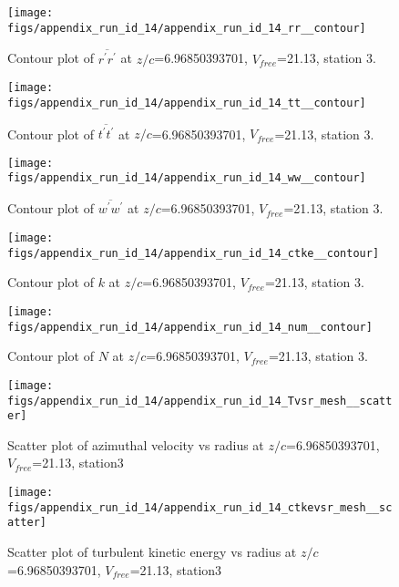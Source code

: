 \begin{figure}[H]
\centering
\texttt{[image: figs/appendix\_run\_id\_14/appendix\_run\_id\_14\_rr\_\_contour]}
\caption{Contour plot of $\overline{r^\prime r^\prime}$ at $z/c$=6.96850393701, $V_{free}$=21.13, station 3.}
\label{fig:appendix_run_id_14_rr__contour}
\end{figure}


\begin{figure}[H]
\centering
\texttt{[image: figs/appendix\_run\_id\_14/appendix\_run\_id\_14\_tt\_\_contour]}
\caption{Contour plot of $\overline{t^\prime t^\prime}$ at $z/c$=6.96850393701, $V_{free}$=21.13, station 3.}
\label{fig:appendix_run_id_14_tt__contour}
\end{figure}


\begin{figure}[H]
\centering
\texttt{[image: figs/appendix\_run\_id\_14/appendix\_run\_id\_14\_ww\_\_contour]}
\caption{Contour plot of $\overline{w^\prime w^\prime}$ at $z/c$=6.96850393701, $V_{free}$=21.13, station 3.}
\label{fig:appendix_run_id_14_ww__contour}
\end{figure}


\begin{figure}[H]
\centering
\texttt{[image: figs/appendix\_run\_id\_14/appendix\_run\_id\_14\_ctke\_\_contour]}
\caption{Contour plot of $k$ at $z/c$=6.96850393701, $V_{free}$=21.13, station 3.}
\label{fig:appendix_run_id_14_ctke__contour}
\end{figure}


\begin{figure}[H]
\centering
\texttt{[image: figs/appendix\_run\_id\_14/appendix\_run\_id\_14\_num\_\_contour]}
\caption{Contour plot of $N$ at $z/c$=6.96850393701, $V_{free}$=21.13, station 3.}
\label{fig:appendix_run_id_14_num__contour}
\end{figure}


\begin{figure}[H]
\centering
\texttt{[image: figs/appendix\_run\_id\_14/appendix\_run\_id\_14\_Tvsr\_mesh\_\_scatter]}
\caption{Scatter plot of azimuthal velocity vs radius at $z/c$=6.96850393701, $V_{free}$=21.13, station3}
\label{fig:appendix_run_id_14_Tvsr_mesh__scatter}
\end{figure}


\begin{figure}[H]
\centering
\texttt{[image: figs/appendix\_run\_id\_14/appendix\_run\_id\_14\_ctkevsr\_mesh\_\_scatter]}
\caption{Scatter plot of turbulent kinetic energy vs radius at $z/c$=6.96850393701, $V_{free}$=21.13, station3}
\label{fig:appendix_run_id_14_ctkevsr_mesh__scatter}
\end{figure}



